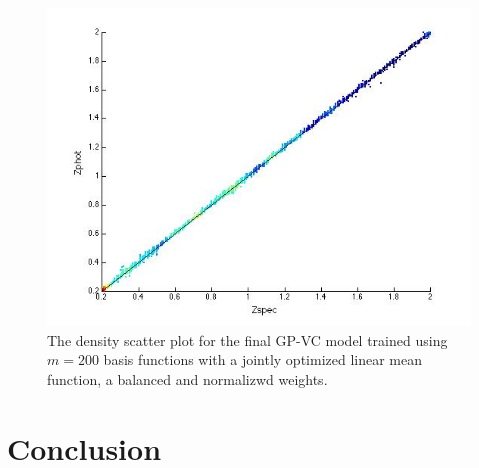 \documentclass[useAMS,usenatbib,fleqn]{mn2e}
\begin{document}
\begin{figure}
       \centering
        \includegraphics[trim = 30px 10px 20px 20px, clip=true,width=1\columnwidth]{final-model.jpg}
        \caption{The density scatter plot for the final GP-VC model trained using $m=200$ basis functions with a jointly optimized linear mean function, a balanced and normalizwd weights. } 
       \label{fig-final-model}
\end{figure}

\section{Conclusion}
\label{sec-conclusion}

\footnotesize{

	
}
\end{document}
